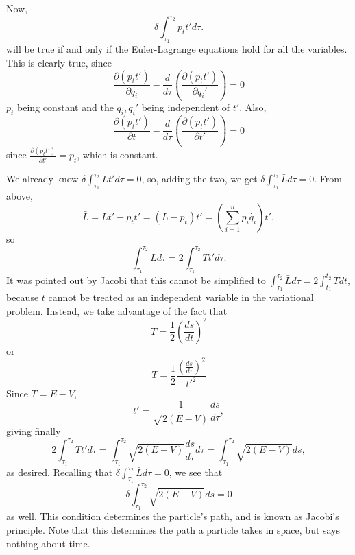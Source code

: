 \documentclass{article}
\begin{document}
Now,
\begin{equation}
\displaystyle\delta\int_{\tau_1}^{\tau_2}p_tt'd\tau.
\end{equation}
will be true if and only if the Euler-Lagrange equations hold for all the variables. This is clearly true, since
\begin{equation}
\frac{\partial(p_tt')}{\partial q_i}-\frac{d}{d\tau}\left(\frac{\partial(p_tt')}{\partial q_i'}\right)=0
\end{equation}
$p_t$ being constant and the $q_i,q_i'$ being independent of $t'$. Also, 
\begin{equation}
\frac{\partial(p_tt')}{\partial t}-\frac{d}{d\tau}\left(\frac{\partial(p_tt')}{\partial t'}\right)=0
\end{equation}
since $\displaystyle\frac{\partial(p_tt')}{\partial t'}=p_t$, which is constant.

We already know $\displaystyle\delta\int_{\tau_1}^{\tau_2}Lt'd\tau=0$, so, adding the two, we get $\displaystyle\delta\int_{\tau_1}^{\tau_2}\bar{L}d\tau=0$. From above, 
\begin{equation}
\bar{L}=Lt'-p_tt'=(L-p_t)t'=\left(\sum_{i=1}^np_i\dot{q_i}\right)t',
\end{equation}
so 
\begin{equation}
\int_{\tau_1}^{\tau_2}\bar{L}d\tau=2\int_{\tau_1}^{\tau_2}Tt'd\tau.
\end{equation}
It was pointed out by Jacobi that this cannot be simplified to $\displaystyle\int_{\tau_1}^{\tau_2}\bar{L}d\tau=2\int_{t_1}^{t_2}Tdt$, because $t$ cannot be treated as an independent variable in the variational problem. Instead, we take advantage of the fact that
\begin{equation}
T=\frac{1}{2}\left(\frac{ds}{dt}\right)^2
\end{equation}
or
\begin{equation}
T=\frac{1}{2}\frac{\left(\frac{ds}{d\tau}\right)^2}{t'^2}
\end{equation}
Since $T=E-V$,
\begin{equation}
t'=\frac{1}{\sqrt{2(E-V)}}\frac{ds}{d\tau},
\end{equation}
giving finally
\begin{equation}
2\int_{\tau_1}^{\tau_2}Tt'd\tau=\int_{\tau_1}^{\tau_2}\sqrt{2(E-V)}\frac{ds}{d\tau}d\tau=\int_{\tau_1}^{\tau_2}\sqrt{2(E-V)}ds,
\end{equation}
as desired. Recalling that $\displaystyle\delta\int_{\tau_1}^{\tau_2}\bar{L}d\tau=0$, we see that
\begin{equation}
\delta\int_{\tau_1}^{\tau_2}\sqrt{2(E-V)}ds=0
\end{equation}
as well. This condition determines the particle's path, and is known as Jacobi's principle. Note that this determines the path a particle takes in space, but says nothing about time.
\end{document}
